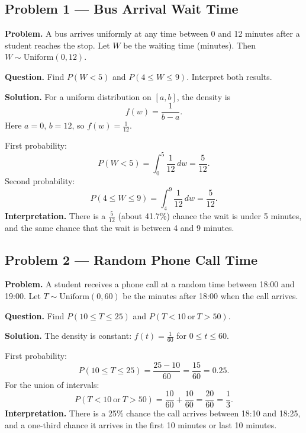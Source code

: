 	\begin{ExamProblems}
		
		\hypertarget{c2-ex1}{}
		\item
		\subsection*{Problem 1 — Bus Arrival Wait Time}
		
		\textbf{Problem.}
		A bus arrives uniformly at any time between 0 and 12 minutes after a student reaches the stop.
		Let \(W\) be the waiting time (minutes). Then \(W\sim\text{Uniform}(0,12)\).
		
		\textbf{Question.} Find \(P(W<5)\) and \(P(4\le W\le 9)\). Interpret both results.
		
		\textbf{Solution.}
		For a uniform distribution on \([a,b]\), the density is
		\[
		f(w)=\frac{1}{b-a}.
		\]
		Here \(a=0\), \(b=12\), so \(f(w)=\frac{1}{12}\).
		
		First probability:
		\[
		P(W<5)=\int_0^5 \frac{1}{12}\,dw=\frac{5}{12}.
		\]
		Second probability:
		\[
		P(4\le W\le 9)=\int_4^9 \frac{1}{12}\,dw=\frac{5}{12}.
		\]
		\textbf{Interpretation.} There is a \(\frac{5}{12}\) (about 41.7\%) chance the wait is under 5 minutes,
		and the same chance that the wait is between 4 and 9 minutes.
		
		
		\hypertarget{c2-ex2}{}
		\item
		\subsection*{Problem 2 — Random Phone Call Time}
		
		\textbf{Problem.}
		A student receives a phone call at a random time between 18:00 and 19:00.
		Let \(T\sim\text{Uniform}(0,60)\) be the minutes after 18:00 when the call arrives.
		
		\textbf{Question.} Find \(P(10\le T\le 25)\) and \(P(T<10\ \text{or}\ T>50)\).
		
		\textbf{Solution.}
		The density is constant: \(f(t)=\frac{1}{60}\) for \(0\le t\le 60\).
		
		First probability:
		\[
		P(10\le T\le 25)=\frac{25-10}{60}=\frac{15}{60}=0.25.
		\]
		For the union of intervals:
		\[
		P(T<10\ \text{or}\ T>50)=\frac{10}{60}+\frac{10}{60}=\frac{20}{60}=\frac{1}{3}.
		\]
		\textbf{Interpretation.} There is a 25\% chance the call arrives between 18:10 and 18:25,
		and a one-third chance it arrives in the first 10 minutes or last 10 minutes.
		

\end{ExamProblems}
